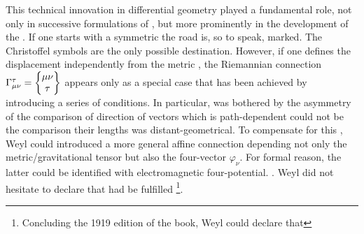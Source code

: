 \documentclass[draft]{article}
\newcommand{\phin}{\ensuremath{\varphi_\nu}\xspace}
\begin{document}


This technical innovation in differential geometry played a fundamental role, not only in successive formulations of \gr, but more prominently in the development of the \uftp. If one starts with a symmetric \gmn the road is, so to speak, marked. The Christoffel symbols are the only possible destination. However, if one defines the displacement \Gtmn independently from the metric \gmn, the Riemannian connection $\Gamma^\tau_{\mu\nu} = \begin{Bmatrix} \mu \nu \\ \tau \end{Bmatrix}$ appears only as a special case that has been achieved by introducing a series of conditions. In particular, \citet{Weyl1918a,Weyl1919a} was bothered by the asymmetry of the comparison of direction of vectors which is path-dependent could not be the comparison their lengths was distant-geometrical. To compensate for this  , Weyl could introduced a more general affine connection depending not only the metric/gravitational tensor \gmn but also the four-vector \phin. For formal reason, the latter could be identified with electromagnetic four-potential. . Weyl did not hesitate to declare that  had be fulfilled \citep[263]{Weyl1919}\footnote{Concluding the 1919 edition of the book, Weyl could declare that }. 
\end{document}
